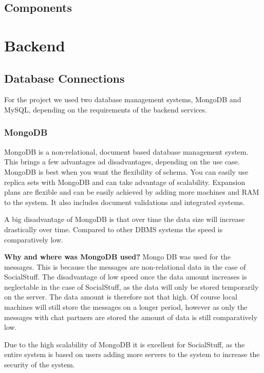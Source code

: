 \subsection{Components}\label{subsec:components}


\section{Backend}\label{sec:backend}

\subsection{Database Connections}\label{subsec:database-connections}

For the project we used two database management systems, MongoDB and MySQL, depending on the requirements of the backend
services.

\subsubsection{MongoDB}
MongoDB is a non-relational, document based database management system.
This brings a few advantages ad disadvantages, depending on the use case.
MongoDB is best when you want the flexibility of schema.
You can easily use replica sets with MongoDB and can take advantage of scalability.
Expansion plans are flexible and can be easily achieved by adding more machines and RAM to the system.
It also includes document validations and integrated systems.

A big disadvantage of MongoDB is that over time the data size will increase drastically over time.
Compared to other DBMS systems the speed is comparatively low.

\textbf{Why and where was MongoDB used?}
Mongo DB was used for the messages.
This is because the messages are non-relational data in the case of SocialStuff.
The disadvantage of low speed once the data amount increases is neglectable in the case of SocialStuff, as the data will
only be stored temporarily on the server.
The data amount is therefore not that high.
Of course local machines will still store the messages on a longer period, however as only the messages with chat
partners are stored the amount of data is still comparatively low.

Due to the high scalability of MongoDB it is excellent for SocialStuff, as the entire system is based on users adding
more servers to the system to increase the security of the system.

